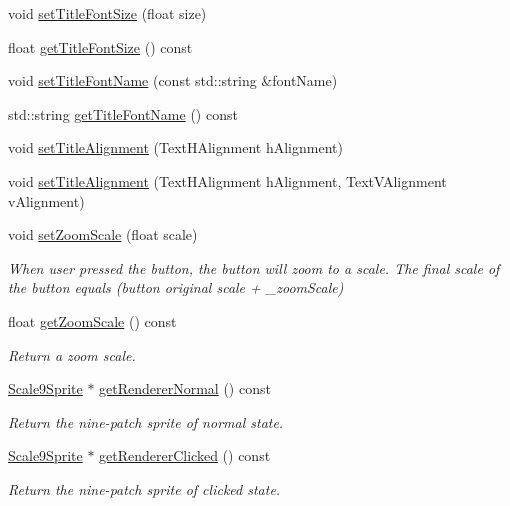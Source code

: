 \begin{DoxyCompactItemize}
\item 
void \hyperlink{classui_1_1Button_a8162f1f44bd3a8477b59af3073d66b69}{set\+Title\+Font\+Size} (float size)
\item 
float \hyperlink{classui_1_1Button_adaf7175abd1a8f0c1d00ed8cc32679cb}{get\+Title\+Font\+Size} () const
\item 
void \hyperlink{classui_1_1Button_ab92d652e5a69eacacd132f549c32f86d}{set\+Title\+Font\+Name} (const std\+::string \&font\+Name)
\item 
std\+::string \hyperlink{classui_1_1Button_a81290d5112bdac0907c96afbd2c32c08}{get\+Title\+Font\+Name} () const
\item 
void \hyperlink{classui_1_1Button_a81ffbdbc79f95c16cda107123ce4d621}{set\+Title\+Alignment} (Text\+H\+Alignment h\+Alignment)
\item 
void \hyperlink{classui_1_1Button_a301e9a57fb9a01b1bc39be603a2e71d6}{set\+Title\+Alignment} (Text\+H\+Alignment h\+Alignment, Text\+V\+Alignment v\+Alignment)
\item 
void \hyperlink{classui_1_1Button_ad3216608c89b27bc1f4e8fde751122a2}{set\+Zoom\+Scale} (float scale)
\begin{DoxyCompactList}\small\item\em When user pressed the button, the button will zoom to a scale. The final scale of the button equals (button original scale + \+\_\+zoom\+Scale) \end{DoxyCompactList}\item 
float \hyperlink{classui_1_1Button_a8a8bf6063a2653a7fb17c98c25f45e29}{get\+Zoom\+Scale} () const
\begin{DoxyCompactList}\small\item\em Return a zoom scale. \end{DoxyCompactList}\item 
\hyperlink{classui_1_1Scale9Sprite}{Scale9\+Sprite} $\ast$ \hyperlink{classui_1_1Button_afcdcb5e3100669ad291c27cf2ae57e19}{get\+Renderer\+Normal} () const
\begin{DoxyCompactList}\small\item\em Return the nine-\/patch sprite of normal state. \end{DoxyCompactList}\item 
\hyperlink{classui_1_1Scale9Sprite}{Scale9\+Sprite} $\ast$ \hyperlink{classui_1_1Button_a523675e1698203d0fd683307e6458bc2}{get\+Renderer\+Clicked} () const
\begin{DoxyCompactList}\small\item\em Return the nine-\/patch sprite of clicked state. \end{DoxyCompactList}\item 

\end{DoxyCompactItemize}
